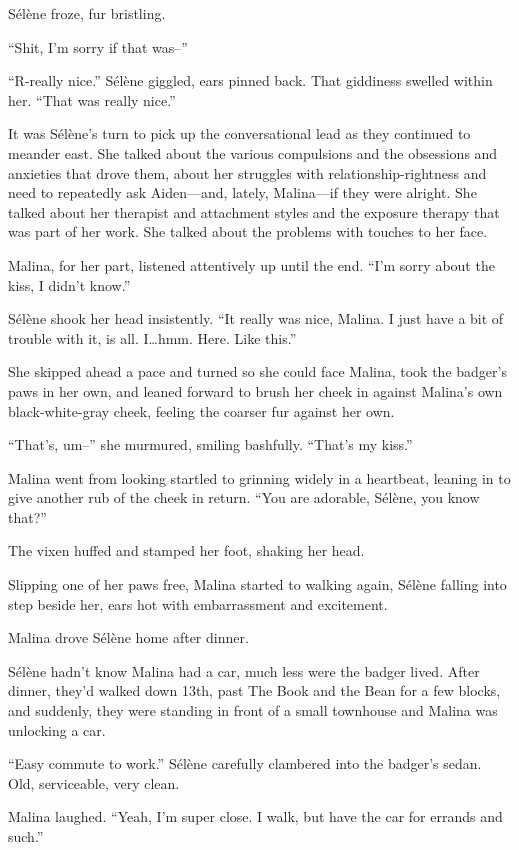 Sélène froze, fur bristling.

``Shit, I'm sorry if that was--''

``R-really nice.'' Sélène giggled, ears pinned back. That giddiness swelled within her. ``That was really nice.''

It was Sélène's turn to pick up the conversational lead as they continued to meander east. She talked about the various compulsions and the obsessions and anxieties that drove them, about her struggles with relationship-rightness and need to repeatedly ask Aiden---and, lately, Malina---if they were alright. She talked about her therapist and attachment styles and the exposure therapy that was part of her work. She talked about the problems with touches to her face.

Malina, for her part, listened attentively up until the end. ``I'm sorry about the kiss, I didn't know.''

Sélène shook her head insistently. ``It really was nice, Malina. I just have a bit of trouble with it, is all. I\ldots{}hmm. Here. Like this.''

She skipped ahead a pace and turned so she could face Malina, took the badger's paws in her own, and leaned forward to brush her cheek in against Malina's own black-white-gray cheek, feeling the coarser fur against her own.

``That's, um--'' she murmured, smiling bashfully. ``That's my kiss.''

Malina went from looking startled to grinning widely in a heartbeat, leaning in to give another rub of the cheek in return. ``You are adorable, Sélène, you know that?''

The vixen huffed and stamped her foot, shaking her head.

Slipping one of her paws free, Malina started to walking again, Sélène falling into step beside her, ears hot with embarrassment and excitement.

\secdiv{}

\noindent Malina drove Sélène home after dinner.

Sélène hadn't know Malina had a car, much less were the badger lived. After dinner, they'd walked down 13th, past The Book and the Bean for a few blocks, and suddenly, they were standing in front of a small townhouse and Malina was unlocking a car.

``Easy commute to work.'' Sélène carefully clambered into the badger's sedan. Old, serviceable, very clean.

Malina laughed. ``Yeah, I'm super close. I walk, but have the car for errands and such.''

